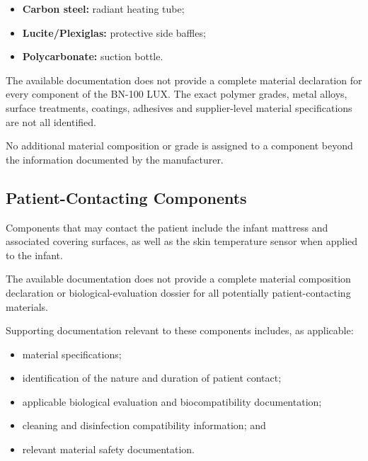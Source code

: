 \begin{itemize}
    \item \textbf{Carbon steel:} radiant heating tube;
    \item \textbf{Lucite/Plexiglas:} protective side baffles;
    \item \textbf{Polycarbonate:} suction bottle.
\end{itemize}

The available documentation does not provide a complete material
declaration for every component of the BN-100 LUX. The exact polymer
grades, metal alloys, surface treatments, coatings, adhesives and
supplier-level material specifications are not all identified.

No additional material composition or grade is assigned to a
component beyond the information documented by the manufacturer.


\subsection*{Patient-Contacting Components}

Components that may contact the patient include the infant mattress
and associated covering surfaces, as well as the skin temperature
sensor when applied to the infant.

The available documentation does not provide a complete material
composition declaration or biological-evaluation dossier for all
potentially patient-contacting materials.

Supporting documentation relevant to these components includes,
as applicable:

\begin{itemize}
    \item material specifications;
    \item identification of the nature and duration of patient contact;
    \item applicable biological evaluation and biocompatibility
    documentation;
    \item cleaning and disinfection compatibility information; and
    \item relevant material safety documentation.
\end{itemize}


